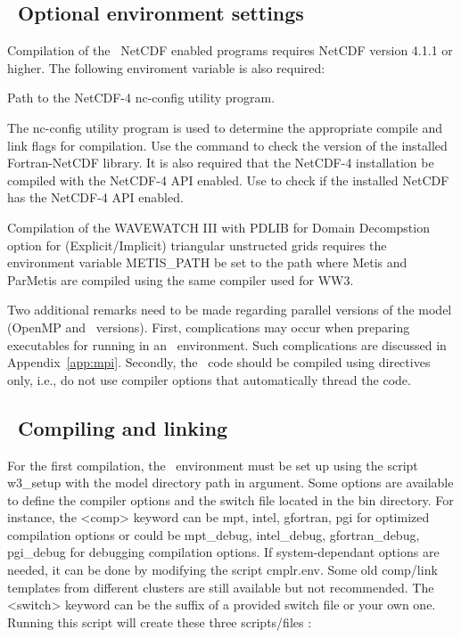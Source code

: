 \vssub
\subsection{~Optional environment settings}
\vssub

Compilation of the \ws\ NetCDF enabled programs requires NetCDF version 4.1.1 or higher.
The following enviroment variable is also required:  
\begin{clist}
 {Path to the NetCDF-4 nc-config utility program.}
\end{clist}
The {\file nc-config} utility program is used to determine the appropriate
compile and link flags for compilation.
Use the command
 to check the version of the installed 
Fortran-NetCDF library.  It is also required that the NetCDF-4 installation 
be compiled with the
NetCDF-4 API enabled.  Use  to check if the
installed NetCDF has the NetCDF-4 API enabled.

\vspace{\baselineskip} 
\noindent
Compilation of the WAVEWATCH III with PDLIB for Domain Decompstion option
for (Explicit/Implicit) triangular unstructed grids requires the environment
variable {\code METIS\_PATH} be set to the path where {\code Metis} and
{\code ParMetis} are compiled using the same compiler used for WW3.

\vspace{\baselineskip}
\noindent
Two additional remarks need to be made regarding parallel versions of the
model (OpenMP and \mpi\ versions). First, complications may occur when
preparing executables for running in an \mpi\ environment. Such complications
are discussed in Appendix~\ref{app:mpi}. Secondly, the \omp\ code should be
compiled using directives only, i.e., do not use compiler options that
automatically thread the code.



\vssub
\subsection{~Compiling and linking} \label{sec:comp}
\vssub

\vspace{\baselineskip} \noindent 
For the first compilation, the \ws\ environment must be set up using the script
{\file w3\_setup} with the model directory path in argument. Some options are
available to define the compiler options and the switch file located in the
{\dir bin} directory. For instance,  the {\code <comp>} keyword can be {\code mpt}, 
{\code intel}, {\code gfortran}, {\code pgi} for optimized compilation options
or could be {\code mpt\_debug}, {\code intel\_debug}, {\code gfortran\_debug},
{\code pgi\_debug} for debugging compilation options. If system-dependant
options are needed, it can be done by modifying the script {\file cmplr.env}. 
Some old comp/link templates from different clusters are still available but 
not recommended. The {\code <switch>} keyword can be the suffix of a provided
switch file or your own one. Running this script will create these three 
scripts/files :

